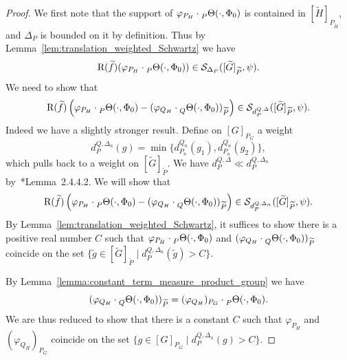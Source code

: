 \documentclass[letterpaper,11pt]{amsart}
\newcommand{\cS}{\mathcal{S}}
\newcommand{\<}{\negthickspace}
\theoremstyle{definition}
\theoremstyle{plain}
\theoremstyle{remark}
\numberwithin{equation}{section}
\begin{document}
\begin{proof}
We first note that the support of $\varphi_{P_H} \cdot
\prescript{}{P}{\Theta}(\cdot, \Phi_0)$ is contained in
$[\widetilde{H}]_{P_{\widetilde{H}}}$, and $\Delta_P$ is bounded on it by
definition. Thus by Lemma~\ref{lem:translation_weighted_Schwartz} we have
    \[
    \mathrm{R}(\widetilde{f}) (\varphi_{P_H} \cdot
    \prescript{}{P}{\Theta}(\cdot, \Phi_0)) \in
    \cS_{\Delta_P}([\widetilde{G}]_{\widetilde{P}}, \psi).
    \]
We need to show that
    \[
    \mathrm{R}(\widetilde{f})\left(\varphi_{P_{H}} \cdot
    \prescript{}{P}{\Theta}(\cdot, \Phi_0) -
    (\varphi_{Q_{H}} \cdot
    \prescript{}{Q}{\Theta}(\cdot, \Phi_0))_{\widetilde{P}} \right)
    \in \cS_{d_P^{Q,\Delta}}
    ([\widetilde{G}]_{\widetilde{P}},\psi).
    \]
Indeed we have a slightly stronger result. Define on $[G]_{P_G}$ a weight
    \[
    d_P^{Q,\Delta_n}(g) = \min\{ d_{P_n}^{Q_n}(g_1),d_{P_n}^{Q_n}(g_2)\},
    \]
which pulls back to a weight on $[\widetilde{G}]_{\widetilde{P}}$. We have
$d_P^{Q, \Delta} \ll d_P^{Q, \Delta_n}$ by~\cite{BPCZ}*{Lemma~2.4.4.2}. We
will show that
    \[
    \mathrm{R}(\widetilde{f})\left(\varphi_{P_{H}} \cdot
    \prescript{}{P}{\Theta}(\cdot, \Phi_0) -
    (\varphi_{Q_{H}} \cdot
    \prescript{}{Q}{\Theta}(\cdot, \Phi_0))_{\widetilde{P}} \right)
    \in \cS_{d_P^{Q,\Delta_n}}
    ([\widetilde{G}]_{\widetilde{P}},\psi).
    \]
By Lemma~\ref{lem:translation_weighted_Schwartz}, it suffices to show there
is a positive real number $C$ such that $\varphi_{P_{H}} \cdot
\prescript{}{P}{\Theta}(\cdot, \Phi_0)$ and $(\varphi_{Q_{H}} \cdot
\prescript{}{Q}{\Theta}(\cdot, \Phi_0))_{\widetilde{P}}$ coincide on the set
$\{ \widetilde{g} \in [\widetilde{G}]_{\widetilde{P}} \mid
d_{P}^{Q,\Delta_n}(\widetilde{g})>C\}$.

By Lemma~\ref{lemma:constant_term_measure_product_group} we have
    \[
    (\varphi_{Q_{H}} \cdot
    \prescript{}{Q}{\Theta}(\cdot, \Phi_0))_{\widetilde{P}} =
    (\varphi_{Q_{H}})_{P_G} \cdot
    \prescript{}{P}{\Theta}(\cdot, \Phi_0).
    \]
We are thus reduced to show that there is a constant $C$ such that
$\varphi_{P_{H}}$ and $(\varphi_{Q_{H}})_{P_G}$ coincide on the set $\{ g \in
[G]_{P_{G}} \mid d_{P}^{Q,\Delta_n}(g)>C\}$.


\end{proof}
\end{document}
